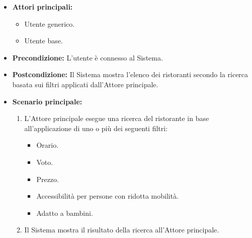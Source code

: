 \label{usecase:Ricerca ristoranti per filtri}
\begin{itemize}
	\item \textbf{Attori principali:} 
	\begin{itemize}
		\item Utente generico.
		\item Utente base.
	\end{itemize}

	\item \textbf{Precondizione:} L'utente è connesso al Sistema.

	\item \textbf{Postcondizione:} Il Sistema mostra l'elenco dei ristoranti secondo la ricerca basata sui filtri applicati dall'Attore principale.

	\item \textbf{Scenario principale:}
	      \begin{enumerate}
		      \item L'Attore principale esegue una ricerca del ristorante in base all'applicazione di uno o più dei seguenti filtri:
		            \begin{itemize}
			            \item Orario.
			            \item Voto.
			            \item Prezzo.
			            \item Accessibilità per persone con ridotta mobilità.
			            \item Adatto a bambini.
		            \end{itemize}
		      \item Il Sistema mostra il risultato della ricerca all'Attore principale.
	      \end{enumerate}
\end{itemize}
